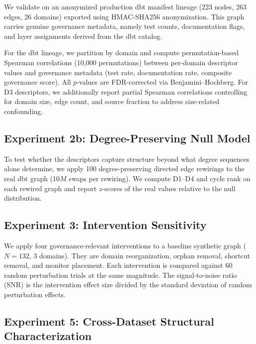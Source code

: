 \documentclass[11pt,a4paper]{article}
\begin{document}
We validate on an anonymized production dbt manifest lineage (223 nodes,
263 edges, 26 domains) exported using HMAC-SHA256 anonymization. This
graph carries genuine governance metadata, namely test counts,
documentation flags, and layer assignments derived from the dbt catalog.

For the dbt lineage, we partition by domain and compute permutation-based
Spearman correlations (10,000 permutations) between per-domain descriptor
values and governance metadata (test rate, documentation rate, composite
governance score). All $p$-values are FDR-corrected via
Benjamini--Hochberg. For D3 descriptors, we additionally report partial
Spearman correlations controlling for domain size, edge count, and source
fraction to address size-related confounding.

\subsection{Experiment 2b: Degree-Preserving Null Model}

To test whether the descriptors capture structure beyond what degree
sequences alone determine, we apply 100 degree-preserving directed edge
rewirings to the real dbt graph (10$M$ swaps per rewiring). We compute
D1--D4 and cycle rank on each rewired graph and report $z$-scores of
the real values relative to the null distribution.

\subsection{Experiment 3: Intervention Sensitivity}

We apply four governance-relevant interventions to a baseline synthetic
graph ($N = 132$, 3 domains). They are domain reorganization, orphan
removal, shortcut removal, and monitor placement. Each intervention is compared
against 60 random perturbation trials at the same magnitude. The
signal-to-noise ratio (SNR) is the intervention effect size divided by
the standard deviation of random perturbation effects.

\subsection{Experiment 5: Cross-Dataset Structural Characterization}
\end{document}
